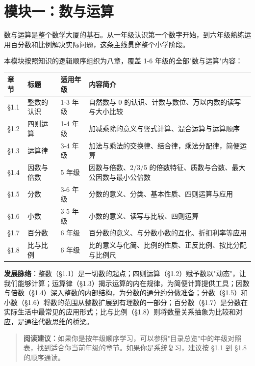 \chapter*{模块一：数与运算}


数与运算是整个数学大厦的基石。从一年级认识第一个数字开始，到六年级熟练运用百分数和比例解决实际问题，这条主线贯穿整个小学阶段。

本模块按照知识的逻辑顺序组织为八章，覆盖 1-6 年级的全部"数与运算"内容：

\begin{center}
\begin{tabular}{llll}
\toprule
章节 & 标题 & 适用年级 & 内容简介 \\
\midrule
§1.1 & 整数的认识 & 1-3 年级 & 自然数与 0 的认识、计数与数位、万以内数的读写与大小比较 \\
§1.2 & 四则运算 & 1-4 年级 & 加减乘除的意义与竖式计算、混合运算与运算顺序 \\
§1.3 & 运算律 & 3-4 年级 & 加法与乘法的交换律、结合律，乘法分配律，简便运算 \\
§1.4 & 因数与倍数 & 5 年级 & 因数与倍数、2/3/5 的倍数特征、质数与合数、最大公因数与最小公倍数 \\
§1.5 & 分数 & 3-6 年级 & 分数的意义、分类、基本性质、四则运算与应用 \\
§1.6 & 小数 & 3-5 年级 & 小数的意义、读写与比较、四则运算 \\
§1.7 & 百分数 & 6 年级 & 百分数的意义、与分数小数的互化、折扣利率等应用 \\
§1.8 & 比与比例 & 6 年级 & 比的意义与化简、比例的性质、正反比例、按比分配与比例尺 \\
\bottomrule
\end{tabular}
\end{center}


\textbf{发展脉络}：整数（§1.1）是一切数的起点；四则运算（§1.2）赋予数以"动态"，让我们能够计算；运算律（§1.3）揭示运算的内在规律，为简便计算提供工具；因数与倍数（§1.4）深入整数的内部结构，为分数的通分约分做准备；分数（§1.5）和小数（§1.6）将数的范围从整数扩展到有理数的一部分；百分数（§1.7）是分数在实际生活中最常见的应用形式；比与比例（§1.8）则将数量关系抽象为比较和对应，是通往代数思维的桥梁。

\begin{quote}\textbf{阅读建议：}如果你是按年级顺序学习，可以参照"目录总览"中的年级对照表，找到适合你当前年级的章节。如果你是系统复习，建议按 §1.1 到 §1.8 的顺序通读。\end{quote}

